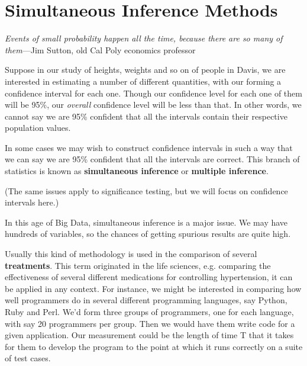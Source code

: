 % 
% 
% 
% 
% 
% 

\section{Simultaneous Inference Methods} 
\label{simultaninfer} 

{\it Events of small probability happen all the time, because there are
so many of them}---Jim Sutton, old Cal Poly economics professor

Suppose in our study of heights, weights and so on of people in Davis,
we are interested in estimating a number of different quantities, with
our forming a confidence interval for each one.  Though our confidence
level for each one of them will be 95\%, our {\it overall} confidence
level will be less than that.  In other words, we cannot say we are 95\%
confident that all the intervals contain their respective population
values.

In some cases we may wish to construct confidence intervals in such a
way that we can say we are 95\% confident that all the intervals are
correct.  This branch of statistics is known as {\bf simultaneous
inference} or {\bf multiple inference}.  

(The same issues apply to significance testing, but we will focus on
confidence intervals here.)

In this age of Big Data, simultaneous inference is a major issue.  We
may have hundreds of variables, so the chances of getting spurious
results are quite high.

Usually this kind of methodology is used in the comparison of several
{\bf treatments}.  This term originated in the life sciences, e.g.
comparing the effectiveness of several different medications for
controlling hypertension, it can be applied in any context.  For
instance, we might be interested in comparing how well programmers do in
several different programming languages, say Python, Ruby and Perl.
We'd form three groups of programmers, one for each language, with say
20 programmers per group.  Then we would have them write code for a
given application.  Our measurement could be the length of time T that
it takes for them to develop the program to the point at which it runs
correctly on a suite of test cases.  

